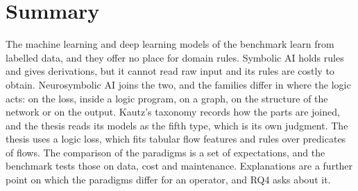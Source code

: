 \section{Summary}
\label{sec:ch4-summary}

The machine learning and deep learning models of the benchmark learn from
labelled data, and they offer no place for domain rules. Symbolic AI holds rules and gives derivations, but
it cannot read raw input and its rules are costly to obtain. Neurosymbolic AI
joins the two, and the families differ in where the logic acts: on the loss,
inside a logic program, on a graph, on the structure of the network or on the
output. Kautz's taxonomy records how the parts are joined, and the thesis
reads its models as the fifth type, which is its own judgment. The thesis
uses a logic loss, which fits tabular flow features and rules over predicates
of flows. The comparison
of the paradigms is a set of expectations, and the benchmark tests those on
data, cost and maintenance. Explanations are a further point on which the
paradigms differ for an operator, and RQ4 asks about it.
